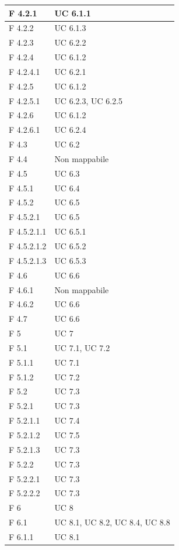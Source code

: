 \documentclass[a4paper,11pt]{article}
\begin{document}
\begin{longtable}{p{}p{}}
\midrule
F 4.2.1 & UC 6.1.1\\
\midrule
F 4.2.2 & UC 6.1.3\\
\midrule
F 4.2.3 & UC 6.2.2\\
\midrule
F 4.2.4 & UC 6.1.2\\
\midrule
F 4.2.4.1 & UC 6.2.1\\
\midrule
F 4.2.5 & UC 6.1.2\\
\midrule
F 4.2.5.1 & UC 6.2.3, UC 6.2.5\\
\midrule
F 4.2.6 & UC 6.1.2\\
\midrule
F 4.2.6.1 & UC 6.2.4\\
\midrule
F 4.3 & UC 6.2\\
\midrule
F 4.4 & Non mappabile\\
\midrule
F 4.5 & UC 6.3\\
\midrule
F 4.5.1 & UC 6.4\\
\midrule
F 4.5.2 & UC 6.5\\
\midrule
F 4.5.2.1 & UC 6.5\\
\midrule
F 4.5.2.1.1 & UC 6.5.1\\
\midrule
F 4.5.2.1.2 & UC 6.5.2\\
\midrule
F 4.5.2.1.3 & UC 6.5.3\\
\midrule
F 4.6 & UC 6.6\\
\midrule
F 4.6.1 & Non mappabile\\
\midrule
F 4.6.2 & UC 6.6\\
\midrule
F 4.7 & UC 6.6\\
\midrule
F 5 & UC 7\\
\midrule
F 5.1 & UC 7.1, UC 7.2\\
\midrule
F 5.1.1 & UC 7.1\\
\midrule
F 5.1.2 & UC 7.2\\
\midrule
F 5.2 & UC 7.3\\
\midrule
F 5.2.1 & UC 7.3\\
\midrule
F 5.2.1.1 & UC 7.4\\
\midrule
F 5.2.1.2 & UC 7.5\\
\midrule
F 5.2.1.3 & UC 7.3\\
\midrule
F 5.2.2 & UC 7.3\\
\midrule
F 5.2.2.1 & UC 7.3\\
\midrule
F 5.2.2.2 & UC 7.3\\
\midrule
F 6 & UC 8\\
\midrule
F 6.1 & UC 8.1, UC 8.2, UC 8.4, UC 8.8\\
\midrule
F 6.1.1 & UC 8.1\\
\midrule

\end{longtable}
\end{document}
